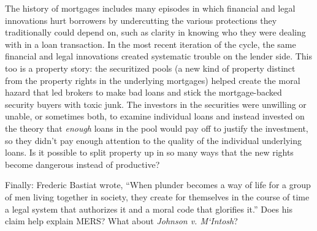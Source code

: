 The history of mortgages includes many episodes in which financial and legal
innovations hurt borrowers by undercutting the various protections they
traditionally could depend on, such as clarity in knowing who they were dealing
with in a loan transaction. In the most recent iteration of the cycle, the same
financial and legal innovations created systematic trouble on the lender side.
This too is a property story: the securitized pools (a new kind of property
distinct from the property rights in the underlying mortgages) helped create
the moral hazard that led brokers to make bad loans and stick the
mortgage-backed security buyers with toxic junk. The investors in the
securities were unwilling or unable, or sometimes both, to examine individual
loans and instead invested on the theory that \textit{enough} loans in the pool
would pay off to justify the investment, so they didn't pay enough attention to
the quality of the individual underlying loans. Is it possible to split
property up in so many ways that the new rights become dangerous instead of
productive?


Finally: Frederic Bastiat wrote, ``When plunder becomes a way of life for a
group of men living together in society, they create for themselves in the
course of time a legal system that authorizes it and a moral code that
glorifies it.'' Does his claim help explain MERS? What about \textit{Johnson
v. M`Intosh}?

